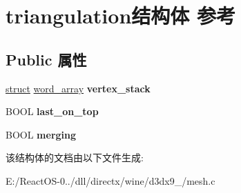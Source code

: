 \hypertarget{structtriangulation}{}\section{triangulation结构体 参考}
\label{structtriangulation}
\subsection*{Public 属性}
\begin{DoxyCompactItemize}
\item 
\mbox{\label{structtriangulation_a2ddd04f2f61b22d1555e21c3b579631b}} 
\hyperlink{interfacestruct}{struct} \hyperlink{structword__array}{word\+\_\+array} {\bfseries vertex\+\_\+stack}
\item 
\mbox{\label{structtriangulation_a10b14273edd590b8b64bed2e0dce44ae}} 
B\+O\+OL {\bfseries last\+\_\+on\+\_\+top}
\item 
\mbox{\label{structtriangulation_a6786d10eb654267bb80f0c760eb3a3f6}} 
B\+O\+OL {\bfseries merging}
\end{DoxyCompactItemize}


该结构体的文档由以下文件生成\+:\begin{DoxyCompactItemize}
\item 
E\+:/\+React\+O\+S-\/0../dll/directx/wine/d3dx9\+\_/mesh.\+c\end{DoxyCompactItemize}
